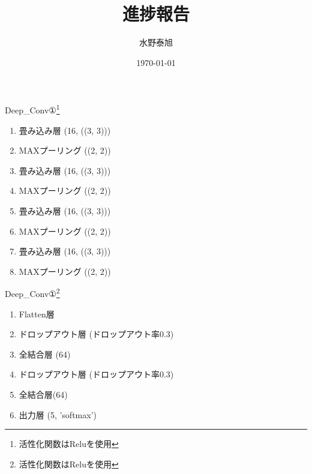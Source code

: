 \documentclass[dvipdfmx]{beamer}
\title{進捗報告}
\date{\today}
\author{水野泰旭}
\institute{弘前大学理工学部電子情報工学科４年}
\begin{document}
  \maketitle
  
  \begin{frame}
    \begin{block}{Deep\_Conv①\footnote{活性化関数はReluを使用}}
      \begin{enumerate}
        \item 畳み込み層\mbox{} (16, ((3, 3)))
        \item MAXプーリング\mbox{} ((2, 2))
        \item 畳み込み層\mbox{} (16, ((3, 3)))
        \item MAXプーリング\mbox{} ((2, 2))
        \item 畳み込み層\mbox{} (16, ((3, 3)))
        \item MAXプーリング\mbox{} ((2, 2))
        \item 畳み込み層\mbox{} (16, ((3, 3)))
        \item MAXプーリング\mbox{} ((2, 2))
      \end{enumerate}
    \end{block}
  \end{frame}

  \begin{frame}
    \begin{block}{Deep\_Conv①\footnote{活性化関数はReluを使用}}
      \begin{enumerate}
        \item Flatten層
        \item ドロップアウト層\mbox{} (ドロップアウト率0.3)
        \item 全結合層\mbox{} (64)
        \item ドロップアウト層\mbox{} (ドロップアウト率0.3)
        \item 全結合層(64)\mbox{}
        \item 出力層\mbox{} (5, 'softmax')
      \end{enumerate}
    \end{block}
  \end{frame}
\end{document}
